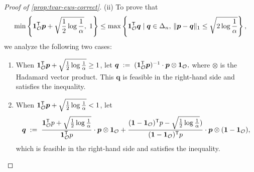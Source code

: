 \documentclass[10pt]{article} %
\begin{document}
\begin{proof}[Proof of \cref{prop:tvar-ews-correct}]
(ii) To prove that 
\[
  \min\left\{ \bm{1}_{\mathcal{O}}^{\mathsf{T}} \bm{p} + \sqrt{\frac{1}{2} \log \frac{1}{\alpha }},\; 1 \right\}
\le \max \left\{ \bm{1}_{\mathcal{O}}^{\mathsf{T}} \bm{q} \mid 
\bm{q} \in \Delta_n, \,
\|\bm{p} -\bm{q}\|_{1} \le  \sqrt{2 \log \frac{1}{\alpha }}
\right\},
\]
we analyze the following two cases:
\begin{enumerate}[nosep]
\item When $\bm{1}_{\mathcal{O}}^{\mathsf{T}}  \bm{p} +  \sqrt{\frac{1}{2} \log \frac{1}{\alpha }} \ge 1$, let \(\bm{q} \;:=\;  (\bm{1}_{\mathcal{O}}^{\mathsf{T}} \bm{p})^{-1} \cdot \bm{p} \otimes \bm{1}_{\mathcal{O}}, \)
  where $\otimes$ is the Hadamard vector product. This $\bm{q}$ is feasible in the right-hand side and satisfies the inequality. 
\item When $\bm{1}_{\mathcal{O}}^{\mathsf{T}}  \bm{p}  + \sqrt{\frac{1}{2} \log \frac{1}{\alpha }}< 1$, let
\[
\bm{q} \;:=\; \frac{\bm{1}_{\mathcal{O}} ^{\mathsf{T}} {p} + \sqrt{\frac{1}{2} \log \frac{1}{\alpha }}}{\bm{1}_{\mathcal{O}} ^{\mathsf{T}} {p}} \cdot \bm{p} \otimes \bm{1}_{\mathcal{O}}
+  \frac{(\bm{1} - \bm{1}_{\mathcal{O}}) ^{\mathsf{T}} {p} - \sqrt{\frac{1}{2} \log \frac{1}{\alpha }} )}{(\bm{1} - \bm{1}_{\mathcal{O}}) ^{\mathsf{T}} {p}}\cdot \bm{p} \otimes (\bm{1} - \bm{1}_{\mathcal{O}}),
\]
which is feasible in the right-hand side and satisfies the inequality. 
\end{enumerate}
\end{proof}
\end{document}
